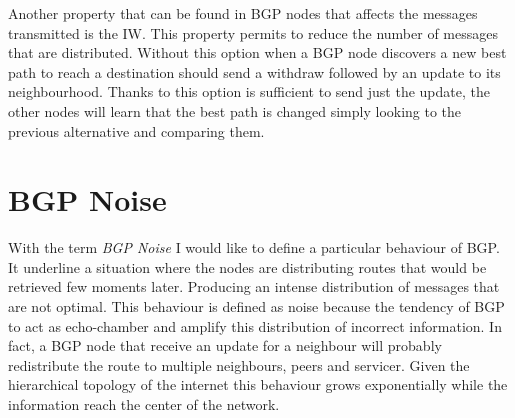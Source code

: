 Another property that can be found in \ac{BGP} nodes that affects the messages
transmitted is the \ac{IW}.
This property permits to reduce the number of messages that are distributed.
Without this option when a \ac{BGP} node discovers a new best path to reach
a destination should send a withdraw followed by an update to its neighbourhood.
Thanks to this option is sufficient to send just the update, the other nodes
will learn that the best path is changed simply looking to the previous
alternative and comparing them.


%

\section{BGP Noise}
\label{sec:bgp_noise}

With the term \textit{BGP Noise} I would like to define a particular behaviour
of \ac{BGP}.
It underline a situation where the nodes are distributing routes
that would be retrieved few moments later.
Producing an intense distribution of messages that are not optimal.
This behaviour is defined as noise because the tendency of \ac{BGP} to act
as echo-chamber and amplify this distribution of incorrect information.
In fact, a \ac{BGP} node that receive an update for a neighbour will probably
redistribute the route to multiple neighbours, peers and servicer.
Given the hierarchical topology of the internet this behaviour grows
exponentially while the information reach the center of the network.

